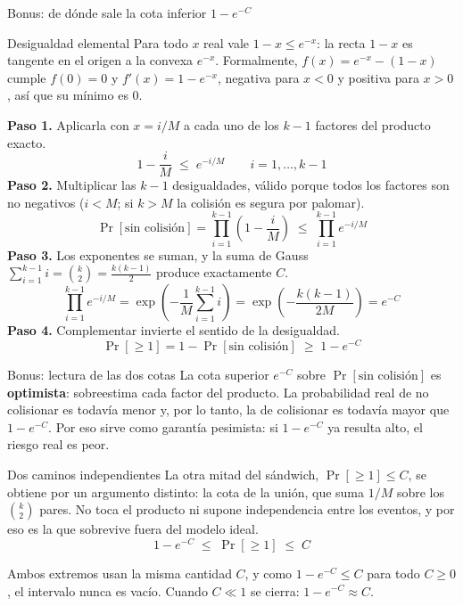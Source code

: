 \documentclass{beamer}
\begin{document}
\begin{frame}{Bonus: de dónde sale la cota inferior $1 - e^{-C}$}
\scriptsize
\setlength{\abovedisplayskip}{2pt}
\setlength{\belowdisplayskip}{2pt}
\setlength{\abovedisplayshortskip}{4pt}
\setlength{\belowdisplayshortskip}{4pt}
\begin{block}{Desigualdad elemental}
Para todo $x$ real vale $1 - x \le e^{-x}$: la recta $1-x$ es tangente en el origen a la convexa $e^{-x}$. Formalmente, $f(x) = e^{-x} - (1-x)$ cumple $f(0) = 0$ y $f'(x) = 1 - e^{-x}$, negativa para $x<0$ y positiva para $x>0$, así que su mínimo es $0$.
\end{block}
\textbf{Paso 1.} Aplicarla con $x = i/M$ a cada uno de los $k-1$ factores del producto exacto.
\[ 1 - \frac{i}{M} \;\le\; e^{-i/M} \qquad i = 1, \dots, k-1 \]
\textbf{Paso 2.} Multiplicar las $k-1$ desigualdades, válido porque todos los factores son no negativos ($i < M$; si $k > M$ la colisión es segura por palomar).
\[ \Pr[\text{sin colisión}] = \prod_{i=1}^{k-1}\left(1-\frac{i}{M}\right) \;\le\; \prod_{i=1}^{k-1} e^{-i/M} \]
\textbf{Paso 3.} Los exponentes se suman, y la suma de Gauss $\sum_{i=1}^{k-1} i = \binom{k}{2} = \frac{k(k-1)}{2}$ produce exactamente $C$.
\[ \prod_{i=1}^{k-1} e^{-i/M} = \exp\left(-\frac{1}{M}\sum_{i=1}^{k-1} i\right) = \exp\left(-\frac{k(k-1)}{2M}\right) = e^{-C} \]
\textbf{Paso 4.} Complementar invierte el sentido de la desigualdad.
\[ \Pr[\ge 1] = 1 - \Pr[\text{sin colisión}] \;\ge\; 1 - e^{-C} \]
\end{frame}

\begin{frame}{Bonus: lectura de las dos cotas}
\footnotesize
La cota superior $e^{-C}$ sobre $\Pr[\text{sin colisión}]$ es \textbf{optimista}: sobreestima cada factor del producto. La probabilidad real de no colisionar es todavía menor y, por lo tanto, la de colisionar es todavía mayor que $1 - e^{-C}$. Por eso sirve como garantía pesimista: si $1 - e^{-C}$ ya resulta alto, el riesgo real es peor.
\begin{block}{Dos caminos independientes}
La otra mitad del sándwich, $\Pr[\ge 1] \le C$, se obtiene por un argumento distinto: la cota de la unión, que suma $1/M$ sobre los $\binom{k}{2}$ pares. No toca el producto ni supone independencia entre los eventos, y por eso es la que sobrevive fuera del modelo ideal.
\[ 1 - e^{-C} \;\le\; \Pr[\ge 1] \;\le\; C \]
\end{block}
Ambos extremos usan la misma cantidad $C$, y como $1 - e^{-C} \le C$ para todo $C \ge 0$, el intervalo nunca es vacío. Cuando $C \ll 1$ se cierra: $1 - e^{-C} \approx C$.
\end{frame}
\end{document}
